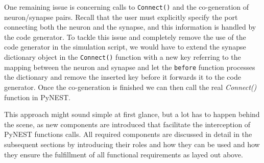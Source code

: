 One remaining issue is concerning calls to \texttt{Connect()} and the co-generation of neuron/synapse pairs. Recall that the user must explicitly specify the port connecting both the neuron and the synapse, and this information is handled by the code generator. To tackle this issue and completely remove the use of the code generator in the simulation script, we would have to extend the synapse dictionary object in the \texttt{Connect()} function with a new key referring to the mapping between the neuron and synapse and let the \texttt{before} function processes the dictionary and remove the inserted key before it forwards it to the code generator. Once the co-generation is finished we can then call the real \emph{Connect()} function in PyNEST.

This approach might sound simple at first glance, but a lot has to happen behind the scene, as new components are introduced that facilitate the interception of PyNEST functions calls. All required components are discussed in detail in the subsequent sections by introducing their roles and how they can be used and how they ensure the fulfillment of all functional requirements as layed out above.



